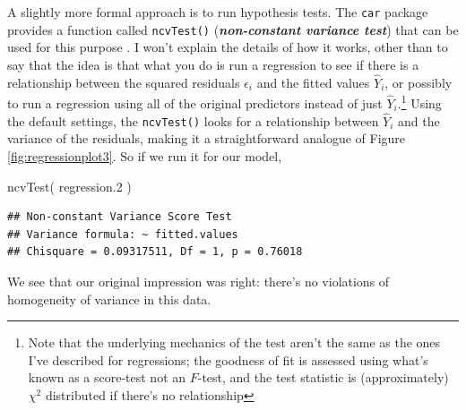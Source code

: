 \documentclass[
]{book}
\newenvironment{Shaded}{\begin{snugshade}}{\end{snugshade}}
\newcommand{\FloatTok}[1]{\textcolor[rgb]{0.00,0.00,0.81}{#1}}
\newcommand{\FunctionTok}[1]{\textcolor[rgb]{0.00,0.00,0.00}{#1}}
\newcommand{\NormalTok}[1]{#1}
\begin{document}
A slightly more formal approach is to run hypothesis tests. The \texttt{car} package provides a function called \texttt{ncvTest()} (\textbf{\emph{non-constant variance test}}) that can be used for this purpose \citep{Cook1983}. I won't explain the details of how it works, other than to say that the idea is that what you do is run a regression to see if there is a relationship between the squared residuals \(\epsilon_i\) and the fitted values \(\hat{Y}_i\), or possibly to run a regression using all of the original predictors instead of just \(\hat{Y}_i\).\footnote{Note that the underlying mechanics of the test aren't the same as the ones I've described for regressions; the goodness of fit is assessed using what's known as a score-test not an \(F\)-test, and the test statistic is (approximately) \(\chi^2\) distributed if there's no relationship} Using the default settings, the \texttt{ncvTest()} looks for a relationship between \(\hat{Y}_i\) and the variance of the residuals, making it a straightforward analogue of Figure \ref{fig:regressionplot3}. So if we run it for our model,

\begin{Shaded}
\begin{Highlighting}[]
\FunctionTok{ncvTest}\NormalTok{( regression}\FloatTok{.2}\NormalTok{ )}
\end{Highlighting}
\end{Shaded}

\begin{verbatim}
## Non-constant Variance Score Test 
## Variance formula: ~ fitted.values 
## Chisquare = 0.09317511, Df = 1, p = 0.76018
\end{verbatim}

We see that our original impression was right: there's no violations of homogeneity of variance in this data.
\end{document}
